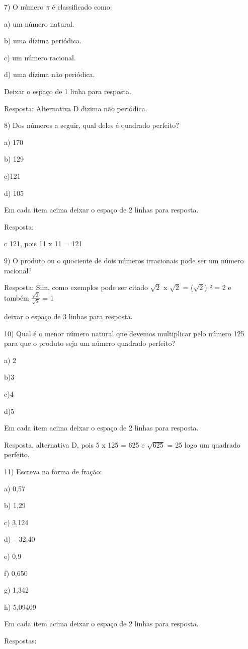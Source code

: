 7) O número \(\pi\) é classificado como:

a) um número natural.

b) uma dízima periódica.

c) um número racional.

d) uma dízima não periódica.

Deixar o espaço de 1 linha para resposta.

Resposta: Alternativa D dizima não periódica.

8) Dos números a seguir, qual deles é quadrado perfeito?

a) 170

b) 129

c)121

d) 105

Em cada item acima deixar o espaço de 2 linhas para resposta.

Resposta:

c 121, pois 11 x 11 = 121

9) O produto ou o quociente de dois números irracionais pode ser um
número racional?

Resposta: Sim, como exemplos pode ser citado \(\sqrt{2}\) x \(\sqrt{2}\)
= (\(\sqrt{2}\)) ² = 2 e também \(\frac{\sqrt{2}}{\sqrt{2}}\) = 1

deixar o espaço de 3 linhas para resposta.

10) Qual é o menor número natural que devemos multiplicar pelo número
125 para que o produto seja um número quadrado perfeito?

a) 2

b)3

c)4

d)5

Em cada item acima deixar o espaço de 2 linhas para resposta.

Resposta, alternativa D, pois 5 x 125 = 625 e \(\sqrt{625}\) = 25 logo
um quadrado perfeito.

11) Escreva na forma de fração:

a) 0,57

b) 1,29

c) 3,124

d) -- 32,40

e) 0,9

f) 0,650

g) 1,342

h) 5,09409

Em cada item acima deixar o espaço de 2 linhas para resposta.

Respostas:

